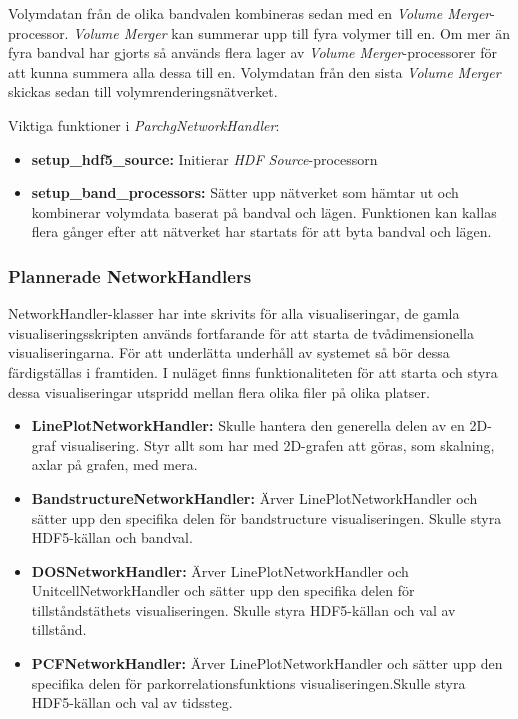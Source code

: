 Volymdatan från de olika bandvalen kombineras sedan med en \textit{Volume Merger}-processor. \textit{Volume Merger} kan summerar upp till fyra volymer till en. Om mer än fyra bandval har gjorts så används flera lager av \textit{Volume Merger}-processorer för att kunna summera alla dessa till en. Volymdatan från den sista \textit{Volume Merger} skickas sedan till volymrenderingsnätverket.

Viktiga funktioner i \textit{ParchgNetworkHandler}:
\begin{itemize}
    \setlength\itemsep{0em}
    \item \textbf{setup\_hdf5\_source: } Initierar \textit{HDF Source}-processorn
    \item \textbf{setup\_band\_processors: } Sätter upp nätverket som hämtar ut och kombinerar volymdata baserat på bandval och lägen. Funktionen kan kallas flera gånger efter att nätverket har startats för att byta bandval och lägen.
\end{itemize}

\newpage

\subsubsection{Plannerade NetworkHandlers}
NetworkHandler-klasser har inte skrivits för alla visualiseringar, de gamla visualiseringsskripten används fortfarande för att starta de tvådimensionella visualiseringarna. För att underlätta underhåll av systemet så bör dessa färdigställas i framtiden. I nuläget finns funktionaliteten för att starta och styra dessa visualiseringar utspridd mellan flera olika filer på olika platser. 
\begin{itemize}
    \setlength\itemsep{0em}
    \item \textbf{LinePlotNetworkHandler: } Skulle hantera den generella delen av en 2D-graf visualisering. Styr allt som har med 2D-grafen att göras, som skalning, axlar på grafen, med mera.
    \item \textbf{BandstructureNetworkHandler: } Ärver LinePlotNetworkHandler och sätter upp den specifika delen för bandstructure visualiseringen. Skulle styra HDF5-källan och  bandval.
    \item \textbf{DOSNetworkHandler: } Ärver LinePlotNetworkHandler och UnitcellNetworkHandler och sätter upp den specifika delen för tillståndstäthets visualiseringen. Skulle styra HDF5-källan och val av tillstånd.
    \item \textbf{PCFNetworkHandler: } Ärver LinePlotNetworkHandler och sätter upp den specifika delen för parkorrelationsfunktions visualiseringen.Skulle styra HDF5-källan och val av tidssteg.
\end{itemize}

